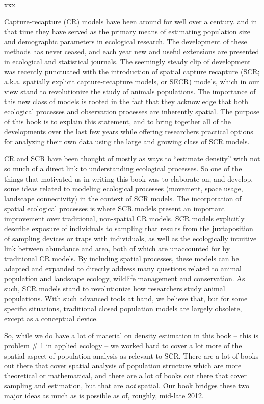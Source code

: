 xxx


Capture-recapture (CR) models have been around for well
over a century, and in that time they have served as the primary means of
estimating population size and demographic parameters in ecological
research. The development of these methods has never ceased, and
each year new and useful extensions are presented in ecological and
statistical journals. The seemingly steady clip of development was
recently punctuated with the introduction of spatial capture
recapture (SCR; a.k.a.  spatially explicit capture-recapture models, or SECR)
 models, which in our view stand to revolutionize the
study of animals populations. The importance of this new class of
models is rooted in the fact that they acknowledge that both
ecological processes and observation processes are inherently
spatial. The purpose of this book is to explain this statement, and
to bring together all of the developments over the last few years
while offering researchers practical options for analyzing their own
data using the large and growing class of SCR models.

CR and SCR have been thought of mostly as ways to ``estimate density''
with not so much of a direct link to understanding ecological
processes. So one of the things that motivated us in writing this book
was to elaborate on, and develop, some ideas related to modeling
ecological processes (movement, space usage, landscape connectivity)
in the context of SCR models.  The incorporation of spatial ecological
processes is where SCR models present an important improvement over
traditional, non-spatial CR models.  SCR models explicitly describe
exposure of individuals to sampling that results from the
juxtaposition of sampling devices or traps with individuals, as well
as the ecologically intuitive link between abundance and area, both of
which are unaccounted for by traditional CR models. By including
spatial processes, these models can be adapted and expanded to
directly address many questions related to animal population and
landscape ecology, wildlife management and conservation.  As such, SCR
models stand to revolutionize how researchers study animal
populations.  With such advanced tools at hand, we believe that, but
for some specific situations, traditional closed population models are
largely obsolete, except as a conceptual device.

So, while we do have a lot of material on density estimation in this
book -- this is problem \# 1 in applied ecology -- we worked hard to
cover a lot more of the spatial aspect of population analysis as
relevant to SCR.  There are a lot of books out there that cover
spatial analysis of population structure which are more theoretical or
mathematical, and there are a lot of books out there that cover
sampling and estimation, but that are {\it not} spatial. Our book
bridges these two major ideas as much as is possible as of, roughly,
mid-late 2012.

